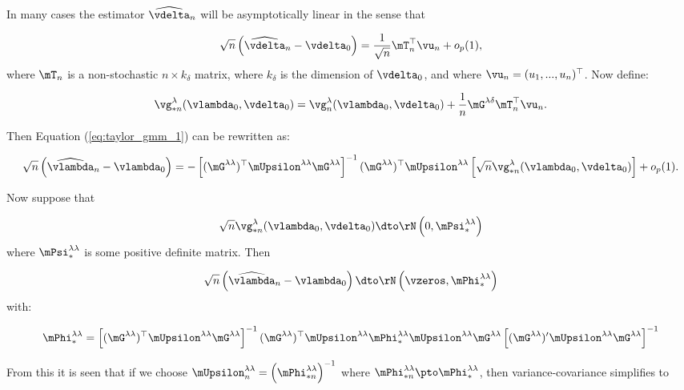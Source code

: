 \documentclass[english,12pt]{book}\usepackage[]{graphicx}\usepackage[]{xcolor}
\begin{document}
In many cases the estimator $\widehat{\vdelta}_n$ will be asymptotically linear in the sense that

\begin{equation*}
\sqrt{n}\left(\widehat{\vdelta}_n - \vdelta_0\right)=\frac{1}{\sqrt{n}}\mT_n^\top\vu_n + o_p(1),
\end{equation*}
%
where $\mT_n$ is a non-stochastic $n\times k_{\delta}$ matrix, where $k_{\delta}$ is the dimension of $\vdelta_0$, and where $\vu_n = (u_1,...,u_n)^\top$. Now define:

\begin{equation*}
\vg_{*n}^{\lambda}(\vlambda_0, \vdelta_0) = \vg_n^{\lambda}(\vlambda_0, \vdelta_0) + \frac{1}{n}\mG^{\lambda\delta}\mT_n^\top\vu_n.
\end{equation*}

Then Equation (\ref{eq:taylor_gmm_1}) can be rewritten as:

\begin{equation}\label{eq:taylor_gmm_2}
\sqrt{n}\left(\widehat{\vlambda}_n - \vlambda_0\right) = - \left[(\mG^{\lambda\lambda})^\top\mUpsilon^{\lambda\lambda}\mG^{\lambda\lambda}\right]^{-1}(\mG^{\lambda\lambda})^\top\mUpsilon^{\lambda\lambda}\left[\sqrt{n}\vg_{*n}^{\lambda}(\vlambda_0, \vdelta_0) \right] + o_p(1).
\end{equation}

Now suppose that 

\begin{equation*}
\sqrt{n}\vg_{*n}^{\lambda}(\vlambda_0, \vdelta_0) \dto \rN\left(0, \mPsi^{\lambda\lambda}_{*}\right) 
\end{equation*}
%
where $\mPsi^{\lambda\lambda}_{*}$ is some positive definite matrix. Then

\begin{equation*}
\sqrt{n}\left(\widehat{\vlambda}_n - \vlambda_0\right)\dto \rN\left(\vzeros, \mPhi_{*}^{\lambda\lambda}\right)
\end{equation*}
%
with:

\begin{equation*}
\mPhi_{*}^{\lambda\lambda} = \left[(\mG^{\lambda\lambda})^\top\mUpsilon^{\lambda\lambda}\mG^{\lambda\lambda}\right]^{-1}(\mG^{\lambda\lambda})^\top\mUpsilon^{\lambda\lambda}\mPhi_{*}^{\lambda\lambda}\mUpsilon^{\lambda\lambda}\mG^{\lambda\lambda}\left[(\mG^{\lambda\lambda})'\mUpsilon^{\lambda\lambda}\mG^{\lambda\lambda}\right]^{-1}
\end{equation*}

From this it is seen that if we choose $\mUpsilon_n^{\lambda\lambda} = \left(\mPhi_{*n}^{\lambda\lambda}\right)^{-1}$ where $\mPhi_{*n}^{\lambda\lambda}\pto \mPhi_{*}^{\lambda\lambda}$, then variance-covariance simplifies to
\end{document}
